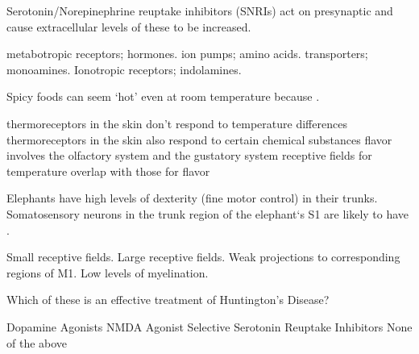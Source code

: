 \documentclass[answers]{exam}
\begin{document}
\begin{questions}
\question Serotonin/Norepinephrine reuptake inhibitors (SNRIs) act on presynaptic \fillin and cause extracellular levels of these \fillin to be increased.
\begin{choices}
\choice metabotropic receptors; hormones.
\choice ion pumps; amino acids.
\correctchoice transporters; monoamines.
\choice Ionotropic receptors; indolamines.
\end{choices}

\question Spicy foods can seem `hot' even at room temperature because \fillin.
\begin{choices}
\choice thermoreceptors in the skin don't respond to temperature differences
\correctchoice thermoreceptors in the skin also respond to certain chemical substances
\choice flavor involves the olfactory system and the gustatory system
\choice receptive fields for temperature overlap with those for flavor
\end{choices}


\question Elephants have high levels of dexterity (fine motor control) in their trunks. Somatosensory neurons in the trunk region of the elephant`s S1 are likely to have \fillin.
\begin{choices}
\correctchoice Small receptive fields.
\choice Large receptive fields.
\choice Weak projections to corresponding regions of M1.
\choice Low levels of myelination.
\end{choices}

\question Which of these is an effective treatment of Huntington’s Disease?
\begin{choices}
\choice Dopamine Agonists
\choice NMDA Agonist
\choice Selective Serotonin Reuptake Inhibitors
\correctchoice None of the above
\end{choices}

\newpage


\end{questions}
\end{document}
